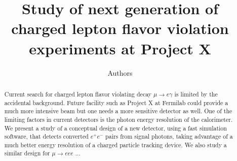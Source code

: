 \documentclass[12pt]{article}
\begin{document}

\title{Study of next generation of charged lepton flavor violation experiments at Project X}

\author{Authors}

\maketitle

\begin{abstract}
Current search for charged lepton flavor violating decay $\mu\to e \gamma$ is 
limited by the accidental background. Future facility such as Project X at 
Fermilab could provide a much more intensive beam but one needs a more 
sensitive detector as well. One of the limiting factors in current detectors
is the photon energy resolution of the calorimeter. We present a study of a
conceptual design of a new detector, using a fast simulation software, that
detects converted $e^+e^-$ pairs from signal photons, taking advantage of a much
better energy resolution of a charged particle tracking device. We also study
a similar design for $\mu\to eee$ ...
\end{abstract}




\end{document}
